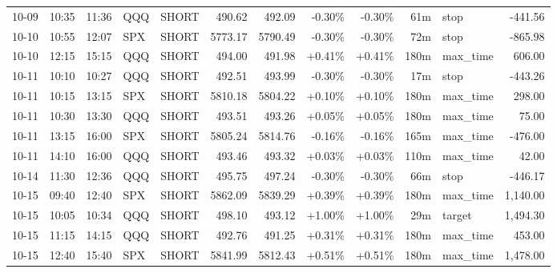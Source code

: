 \documentclass[11pt,a4paper,twoside]{article}
\begin{document}
\begin{center}
\begin{longtable}{>{\color{txtmain}}l l l l l r r r r r >{\color{txtmain}}l r}
10-09 & 10:35 & 11:36 & QQQ & SHORT & 490.62 & 492.09 & \textcolor{lossred}{-0.30\%} & \textcolor{lossred}{-0.30\%} & 61m & stop & \textcolor{lossred}{-441.56} \\
10-10 & 10:55 & 12:07 & SPX & SHORT & 5773.17 & 5790.49 & \textcolor{lossred}{-0.30\%} & \textcolor{lossred}{-0.30\%} & 72m & stop & \textcolor{lossred}{-865.98} \\
10-10 & 12:15 & 15:15 & QQQ & SHORT & 494.00 & 491.98 & \textcolor{wingreen}{+0.41\%} & \textcolor{wingreen}{+0.41\%} & 180m & max\_time & \textcolor{wingreen}{606.00} \\
10-11 & 10:10 & 10:27 & QQQ & SHORT & 492.51 & 493.99 & \textcolor{lossred}{-0.30\%} & \textcolor{lossred}{-0.30\%} & 17m & stop & \textcolor{lossred}{-443.26} \\
10-11 & 10:15 & 13:15 & SPX & SHORT & 5810.18 & 5804.22 & \textcolor{wingreen}{+0.10\%} & \textcolor{wingreen}{+0.10\%} & 180m & max\_time & \textcolor{wingreen}{298.00} \\
10-11 & 10:30 & 13:30 & QQQ & SHORT & 493.51 & 493.26 & \textcolor{wingreen}{+0.05\%} & \textcolor{wingreen}{+0.05\%} & 180m & max\_time & \textcolor{wingreen}{75.00} \\
10-11 & 13:15 & 16:00 & SPX & SHORT & 5805.24 & 5814.76 & \textcolor{lossred}{-0.16\%} & \textcolor{lossred}{-0.16\%} & 165m & max\_time & \textcolor{lossred}{-476.00} \\
10-11 & 14:10 & 16:00 & QQQ & SHORT & 493.46 & 493.32 & \textcolor{wingreen}{+0.03\%} & \textcolor{wingreen}{+0.03\%} & 110m & max\_time & \textcolor{wingreen}{42.00} \\
10-14 & 11:30 & 12:36 & QQQ & SHORT & 495.75 & 497.24 & \textcolor{lossred}{-0.30\%} & \textcolor{lossred}{-0.30\%} & 66m & stop & \textcolor{lossred}{-446.17} \\
10-15 & 09:40 & 12:40 & SPX & SHORT & 5862.09 & 5839.29 & \textcolor{wingreen}{+0.39\%} & \textcolor{wingreen}{+0.39\%} & 180m & max\_time & \textcolor{wingreen}{1,140.00} \\
10-15 & 10:05 & 10:34 & QQQ & SHORT & 498.10 & 493.12 & \textcolor{wingreen}{+1.00\%} & \textcolor{wingreen}{+1.00\%} & 29m & target & \textcolor{wingreen}{1,494.30} \\
10-15 & 11:15 & 14:15 & QQQ & SHORT & 492.76 & 491.25 & \textcolor{wingreen}{+0.31\%} & \textcolor{wingreen}{+0.31\%} & 180m & max\_time & \textcolor{wingreen}{453.00} \\
10-15 & 12:40 & 15:40 & SPX & SHORT & 5841.99 & 5812.43 & \textcolor{wingreen}{+0.51\%} & \textcolor{wingreen}{+0.51\%} & 180m & max\_time & \textcolor{wingreen}{1,478.00} \\

\end{longtable}
\end{center}
\end{document}
